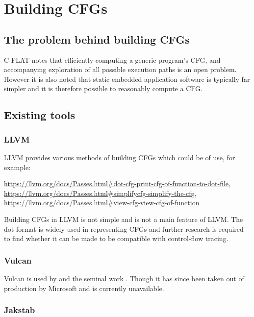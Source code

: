 \section{Building CFGs}

\subsection{The problem behind building CFGs}

C-FLAT \cite{Abera2016} notes that efficiently computing a generic program's CFG, and accompanying exploration of all possible execution paths is an open problem. However it is also noted that static embedded application software is typically far simpler and it is therefore possible to reasonably compute a CFG.
\subsection{Existing tools}

\subsubsection{LLVM}

LLVM provides various methods of building CFGs which could be of use, for example:

\url{https://llvm.org/docs/Passes.html#dot-cfg-print-cfg-of-function-to-dot-file},\\
\url{https://llvm.org/docs/Passes.html#simplifycfg-simplify-the-cfg},\\
\url{https://llvm.org/docs/Passes.html#view-cfg-view-cfg-of-function}

Building CFGs in LLVM is not simple and is not a main feature of LLVM. The dot format is widely used in representing CFGs and further research is required to find whether it can be made to be compatible with control-flow tracing.

\subsubsection{Vulcan}

Vulcan \cite{Edwards2001} is used by \cite{Davi2012} and the seminal work \cite{Abadi2005}. Though it has since been taken out of production by Microsoft and is currently unavailable.

\subsubsection{Jakstab}

